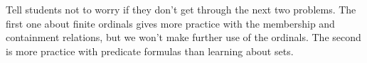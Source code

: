 \documentclass[handout]{mcs}
\begin{document}



\begin{staffnotes}
Tell students not to worry if they don't get through the next two
problems.  The first one about finite ordinals gives more practice
with the membership and containment relations, but we won't make
further use of the ordinals.  The second is more practice with
predicate formulas than learning about sets.
\end{staffnotes}






\end{document}
